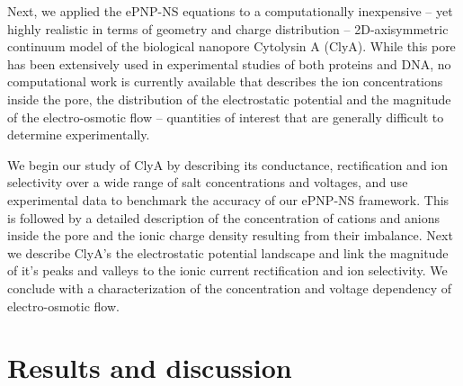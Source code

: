 \documentclass[journal=ancac3,manuscript=article,etalmode=truncate,maxauthors=0,layout=twocolumn]{achemso}
\begin{document}
Next, we applied the ePNP-NS equations to a computationally inexpensive -- yet highly realistic in terms of geometry and charge distribution -- 2D-axisymmetric continuum model of the biological nanopore Cytolysin A (ClyA).\cite{Soskine-2012,Soskine-2013} While this pore has been extensively used in experimental studies of both proteins\cite{Soskine-2013,VanMeervelt-2014,Soskine-Biesemans-2015,Biesemans-Soskine-2015,Wloka-2017,
VanMeervelt-2017,Galenkamp-2018} and DNA,\cite{Franceschini-2013,Franceschini-2016} no computational work is currently available that describes the ion concentrations inside the pore, the distribution of the electrostatic potential and the magnitude of the electro-osmotic flow -- quantities of interest that are generally difficult to determine experimentally.

We begin our study of ClyA by describing its conductance, rectification and ion selectivity over a wide
range of salt concentrations and voltages, and use experimental data to benchmark the accuracy of our ePNP-NS framework. This is followed by a detailed description of the concentration of cations and anions inside the pore and the ionic charge density resulting from their imbalance. Next we describe ClyA's the electrostatic potential landscape and link the magnitude of it's peaks and valleys to the ionic current rectification and ion selectivity. We conclude with a characterization of the concentration and voltage dependency of electro-osmotic flow.




\section{Results and discussion}\label{sect:results}
\end{document}
